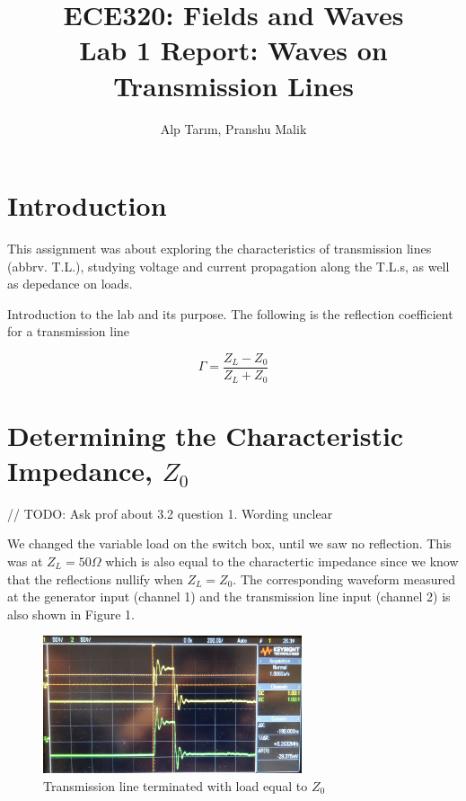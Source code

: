 \documentclass[10pt]{article}
\begin{document}
\title{\textbf{\Large{\textsc{ECE320:} Fields and Waves}} \\ \Large{Lab 1 Report: Waves on Transmission Lines}}
\author{Alp Tarım, Pranshu Malik}


\maketitle

\section{Introduction}
This assignment was about exploring the characteristics of transmission lines (abbrv. T.L.), studying voltage and current 
propagation along the T.L.s, as well as depedance on loads.

Introduction to the lab and its purpose. The following is the reflection coefficient for a transmission line

\[
    \label{simple_equation}
    \Gamma = \frac{Z_L - Z_0}{Z_L + Z_0}
\]

\section{Determining the Characteristic Impedance, $Z_0$}

// TODO: Ask prof about 3.2 question 1. Wording unclear

We changed the variable load on the switch box, until we saw no reflection.
This was at $Z_L = 50 \Omega$ which is also equal to the charactertic impedance 
since we know that the reflections nullify when $Z_L = Z_0$. The corresponding waveform
measured at the generator input (channel 1) and the transmission line input (channel 2) is also shown in Figure 1.

\begin{figure}[h]
    \centering
    \includegraphics[width=3.0in]{photos/lab1/load_matched.jpg}
    \caption{Transmission line terminated with load equal to $Z_0$}
    \label{simulationfigure}
\end{figure}
\end{document}
